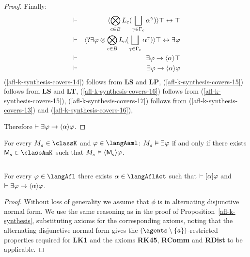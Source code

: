 \begin{proof}
Finally:
\begin{eqnarray}
&\proves& \actionE{\bigcompose_{\agentC \in \agentsB} \learnsC (\bigchoice_{\gamma \in \Gamma_\agentC} \alpha^\gamma)} \top \iff \top\label{afl-k-synthesis-covers-14}\\
&\proves& \actionE{\test{\somerefs \phi} \compose \bigcompose_{\agentC \in \agentsB} \learnsC (\bigchoice_{\gamma \in \Gamma_\agentC} \alpha^\gamma)} \top \iff \somerefs \phi\label{afl-k-synthesis-covers-15}\\
&\proves& \somerefs \phi \implies \actionE{\alpha} \top\label{afl-k-synthesis-covers-16}\\
&\proves& \somerefs \phi \implies \actionE{\alpha} \phi\label{afl-k-synthesis-covers-17}
\end{eqnarray}
(\ref{afl-k-synthesis-covers-14}) follows from {\bf LS} and {\bf LP},
(\ref{afl-k-synthesis-covers-15}) follows from {\bf LS} and {\bf LT},
(\ref{afl-k-synthesis-covers-16}) follows from (\ref{afl-k-synthesis-covers-15}),
(\ref{afl-k-synthesis-covers-17}) follows from (\ref{afl-k-synthesis-covers-13}) and (\ref{afl-k-synthesis-covers-16}),

Therefore $\proves \somerefs \phi \implies \actionE{\alpha} \phi$.
\end{proof}

\begin{corollary}
For every $\kPModel{\kStateS} \in \classK$ and $\phi \in \langAaml$: $\kPModel{\kStateS} \entails \somerefs \phi$ if and only if there exists $\aPModel{\aStateS} \in \classAmK$ such that $\kPModel{\kStateS} \entails \actionE{\aPModel{\aStateS}} \phi$.
\end{corollary}

\subsection{\classKFF{}}

\begin{proposition}\label{afl-kff-synthesis}
For every $\phi \in \langAfl$ there exists $\alpha \in \langAflAct$ such that $\vdash {[ {\alpha} ]} \varphi$ and $\proves \somerefs \phi \implies \actionE{\alpha} \phi$.
\end{proposition} 

\begin{proof}
Without loss of generality we assume that $\phi$ is in alternating disjunctive normal form.
We use the same reasoning as in the proof of Proposition~\ref{afl-k-synthesis}, substituting \axiomAflKFF{} axioms for the corresponding \axiomAflK{} axioms, noting that the alternating disjunctive normal form gives the $(\agents \setminus \{\agentA\})$-restricted properties required for {\bf LK1} and the \axiomRmlKFF{} axioms {\bf RK45}, {\bf RComm} and  {\bf RDist} to be applicable.
\end{proof}

